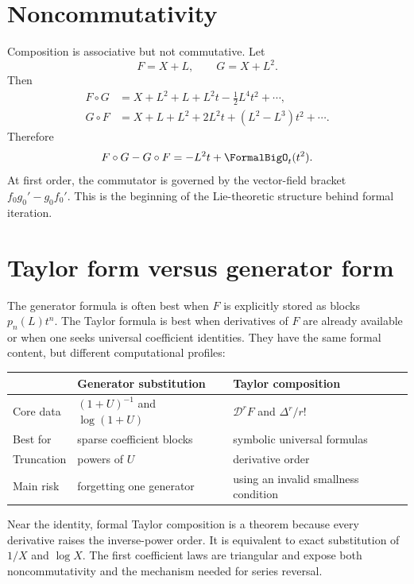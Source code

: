 \documentclass[11pt,oneside]{book}
\theoremstyle{definition}
\theoremstyle{remark}
\newcommand{\D}{\mathcal D}
\newcommand{\compose}{\mathbin{\circ}}
\begin{document}
\section{Noncommutativity}
Composition is associative but not commutative.  Let
\[
 F=X+L,
 \qquad
 G=X+L^2.
\]
Then
\begin{align*}
 F\compose G
 &=X+L^2+L+L^2t-\frac12L^4t^2+\cdots,\\
 G\compose F
 &=X+L+L^2+2L^2t+(L^2-L^3)t^2+\cdots.
\end{align*}
Therefore
\begin{equation}\label{eq:composition-noncommutative}
 F\compose G-G\compose F=-L^2t+\FormalBigO_t(t^2).
\end{equation}
At first order, the commutator is governed by the vector-field bracket
$f_0g_0'-g_0f_0'$.  This is the beginning of the Lie-theoretic structure
behind formal iteration.

\section{Taylor form versus generator form}
The generator formula is often best when $F$ is explicitly stored as blocks
$p_n(L)t^n$.  The Taylor formula is best when derivatives of $F$ are already
available or when one seeks universal coefficient identities.  They have the
same formal content, but different computational profiles:
\begin{center}
\begin{tabularx}{0.94\textwidth}{@{}lXX@{}}
\toprule
 & Generator substitution & Taylor composition \\
\midrule
Core data & $(1+U)^{-1}$ and $\log(1+U)$ & $\D^rF$ and $\Delta^r/r!$ \\
Best for & sparse coefficient blocks & symbolic universal formulas \\
Truncation & powers of $U$ & derivative order \\
Main risk & forgetting one generator & using an invalid smallness condition \\
\bottomrule
\end{tabularx}
\end{center}

\begin{summarybox}
Near the identity, formal Taylor composition is a theorem because every
derivative raises the inverse-power order.  It is equivalent to exact
substitution of $1/X$ and $\log X$.  The first coefficient laws are triangular
and expose both noncommutativity and the mechanism needed for series reversal.
\end{summarybox}
\end{document}
